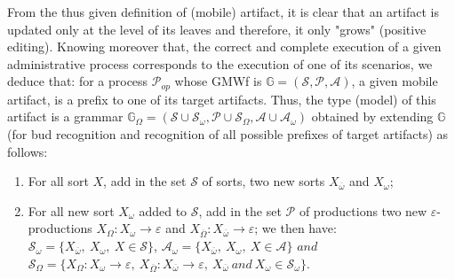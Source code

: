 From the thus given definition of (mobile) artifact, it is clear that an artifact is updated only at the level of its leaves and therefore, it only "grows" (positive editing). Knowing moreover that, the correct and complete execution of a given administrative process corresponds to the execution of one of its scenarios, we deduce that: for a process $\mathcal{P}_{op}$ whose GMWf is $\mathbb{G}=\left(\mathcal{S},\mathcal{P},\mathcal{A}\right)$, a given mobile artifact, is a prefix to one of its target artifacts. Thus, the type (model) of this artifact is a grammar $\mathbb{G}_{\Omega}=(\mathcal{S}\cup\mathcal{S}_{\omega},\mathcal{P}\cup\mathcal{S}_{\Omega},\mathcal{A}\cup\mathcal{A}_{\omega})$ obtained by extending $\mathbb{G}$ (for bud recognition and recognition of all possible prefixes of target artifacts) as follows:
\begin{enumerate}
\item For all sort $X$, add in the set $\mathcal{S}$ of sorts, two new sorts $X_{\overline{\omega}}$ and $X_{\omega}$;

\item For all new sort $X_{\omega}$ added to $\mathcal{S}$, add in the set $\mathcal {P}$ of productions two new $\varepsilon$-productions $X_{\Omega} : X_{\omega} \rightarrow \varepsilon$ and $X_{\overline{\Omega}} : X_{\overline{\omega}} \rightarrow \varepsilon$; 
we then have: $\mathcal{S}_{\omega}=\{X_{\overline{\omega}}, ~X_{\omega},~ X\in\mathcal {S}\}$, $ \mathcal{A}_{\omega}=\{X_{\overline{\omega}}, ~X_{\omega},~ X\in\mathcal{A}\} $ $ and $ $\mathcal{S}_{\Omega} = \{X_{\Omega} : X_{\omega} \rightarrow \varepsilon, ~X_{\overline{\Omega}} : X_{\overline{\omega}} \rightarrow \varepsilon,~ X_{\overline{\omega}}~and~X_{\omega} \in \mathcal{S}_{\omega}\}$.
\end{enumerate}

